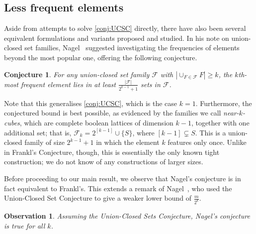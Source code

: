 \documentclass[a4paper,12pt]{article}
\theoremstyle{mystyle}	%
\newtheorem{observation}[theorem]{Observation}
\newtheorem{conjecture}[theorem]{Conjecture}
\theoremstyle{definition}
\newcommand{\F}{\mathcal{F}}
\newcommand{\6}{\partial}
\begin{document}
\subsection{Less frequent elements}

Aside from attempts to solve \cref{conj:UCSC} directly, there have also been several equivalent formulations and variants proposed and studied. In his note on union-closed set families, Nagel~\cite{nagel2023notes} suggested investigating the frequencies of elements beyond the most popular one, offering the following conjecture.

\begin{conjecture} \label{conj:nagel}
    For any union-closed set family $\mathcal{F}$ with $|\cup_{F \in \mathcal{F}} F| \ge k$, the $k$th-most frequent element lies in at least $\frac{|\F|}{2^{k-1}+1}$ sets in $\mathcal{F}$.
\end{conjecture}

Note that this generalises \cref{conj:UCSC}, which is the case $k = 1$. Furthermore, the conjectured bound is best possible, as evidenced by the families we call \emph{near-$k$-cubes}, which are complete boolean lattices of dimension $k-1$, together with one additional set; that is, $\mathcal{F}_k = 2^{[k-1]}\cup \{S\}$, where $[k-1] \subsetneq S$. This is a union-closed family of size $2^{k-1} + 1$ in which the element $k$ features only once. Unlike in Frankl's Conjecture, though, this is essentially the only known tight construction; we do not know of any constructions of larger sizes.

Before proceeding to our main result, we observe that Nagel's conjecture is in fact equivalent to Frankl's. This extends a remark of Nagel~\cite{nagel2023notes}, who used the Union-Closed Set Conjecture to give a weaker lower bound of $\frac{m}{2^k}$.

\begin{observation} \label{obs:equivalence}
    Assuming the Union-Closed Sets Conjecture, Nagel's conjecture is true for all $k$.
\end{observation}
\end{document}
